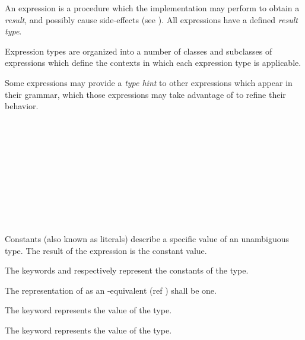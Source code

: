 
\specsubitem
An expression is a procedure which the implementation may perform to obtain a
\textit{result}, and possibly cause side-effects (see
). All expressions have a defined
\textit{result type}.

\specsubitem
Expression types are organized into a number of classes and subclasses of
expressions which define the contexts in which each expression type is
applicable.

\specsubitem
Some expressions may provide a \textit{type hint} to other expressions which
appear in their grammar, which those expressions may take advantage of to
refine their behavior.


\begin{grammar}
 \\
	 \\
	 \\
	 \\
	 \\
	 \\
	 \\
	 \\
	 \\
\end{grammar}

\specsubsubitem
Constants (also known as literals) describe a specific value of an unambiguous
type. The result of the expression is the constant value.

\specsubsubitem
The keywords  and  respectively represent
the constants of the  type.

\specsubsubitem
The representation of  as an -equivalent (ref
) shall be one.

\specsubsubitem
The  keyword represents the  value of the
 type.

\specsubsubitem
The  keyword represents the  value of the
 type.


